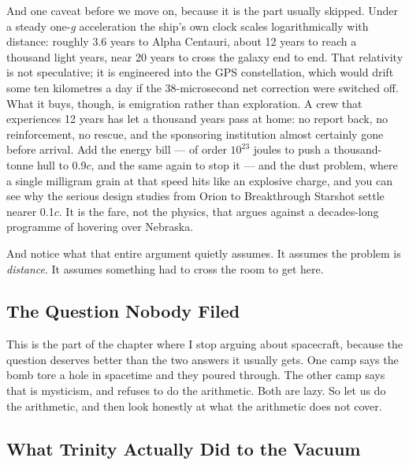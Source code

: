 And one caveat before we move on, because it is the part usually skipped.  Under a steady one-\textit{g} acceleration the ship's own clock scales logarithmically with
distance: roughly 3.6 years to Alpha Centauri, about 12 years to reach a thousand light years, near 20
years to cross the galaxy end to end. That relativity is not speculative; it is engineered into the GPS
constellation, which would drift some ten kilometres a day if the 38-microsecond net correction were
switched off. What it buys, though, is emigration rather than exploration. A crew that experiences 12
years has let a thousand years pass at home: no report back, no reinforcement, no rescue, and the
sponsoring institution almost certainly gone before arrival. Add the energy bill --- of order
$10^{23}$ joules to push a thousand-tonne hull to 0.9$c$, and the same again to stop it --- and the
dust problem, where a single milligram grain at that speed hits like an explosive charge, and you can
see why the serious design studies from Orion to Breakthrough Starshot settle nearer 0.1$c$.
 It is the fare, not the physics, that
argues against a decades-long programme of hovering over Nebraska.

And notice what that entire argument quietly assumes. It assumes the problem is \emph{distance}. It
assumes something had to cross the room to get here.

\subsection{The Question Nobody Filed}\label{sub:questionnobodyfiled}


This is the part of the chapter where I stop arguing about spacecraft, because the question deserves
better than the two answers it usually gets. One camp says the bomb tore a hole in spacetime and they
poured through. The other camp says that is mysticism, and refuses to do the arithmetic. Both are
lazy. So let us do the arithmetic, and then look honestly at what the arithmetic does not cover.
\subsection{What Trinity Actually Did to the Vacuum}\label{sub:trinityvacuum}

